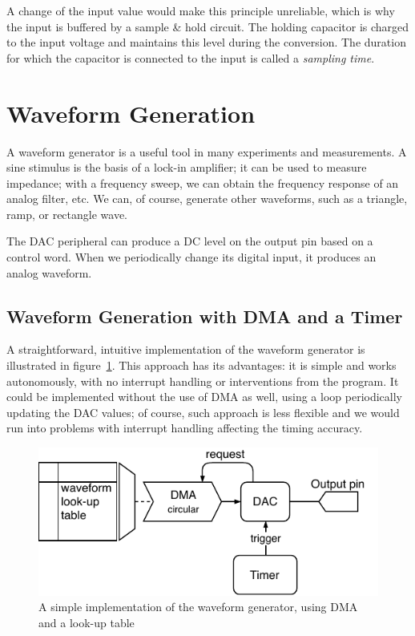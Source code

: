A change of the input value would make this principle unreliable, which is why the input is buffered by a sample \& hold circuit. The holding capacitor is charged to the input voltage and maintains this level during the conversion. The duration for which the capacitor is connected to the input is called a \textit{sampling time}.

\section{Waveform Generation} \label{sec:theory-dac}

A waveform generator is a useful tool in many experiments and measurements. A sine stimulus is the basis of a lock-in amplifier; it can be used to measure impedance; with a frequency sweep, we can obtain the frequency response of an analog filter, etc. We can, of course, generate other waveforms, such as a triangle, ramp, or rectangle wave.

The \gls{DAC} peripheral can produce a \gls{DC} level on the output pin based on a control word. When we periodically change its digital input, it produces an analog waveform.

\subsection{Waveform Generation with DMA and a Timer} \label{sec:theory-dac-simple}

A straightforward, intuitive implementation of the waveform generator is illustrated in figure~\ref{fig:wavegen-naive}. This approach has its advantages: it is simple and works autonomously, with no interrupt handling or interventions from the program. It could be implemented without the use of \gls{DMA} as well, using a loop periodically updating the \gls{DAC} values; of course, such approach is less flexible and we would run into problems with interrupt handling affecting the timing accuracy.

\begin{figure}[h]
	\centering
	\includegraphics[scale=1.1] {img/wavegen-naive.pdf}
	\caption[A simple implementation of the waveform generator]{\label{fig:wavegen-naive}A simple implementation of the waveform generator, using DMA and a look-up table}
\end{figure}

